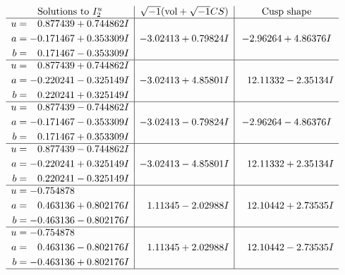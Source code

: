 \documentclass[1p]{elsarticle_modified}
\theoremstyle{definition}
\newcommand{\I}{\sqrt{-1}}
\begin{document}
$$\begin{array}{c|c|c}  
\text{Solutions to }I^u_{2}& \I (\text{vol} + \sqrt{-1}CS) & \text{Cusp shape}\\
 \hline 
\begin{aligned}
u &= \phantom{-}0.877439 + 0.744862 I \\
a &= -0.171467 + 0.353309 I \\
b &= \phantom{-}0.171467 - 0.353309 I\end{aligned}
 & -3.02413 + 0.79824 I & -2.96264 + 4.86376 I \\ \hline\begin{aligned}
u &= \phantom{-}0.877439 + 0.744862 I \\
a &= -0.220241 - 0.325149 I \\
b &= \phantom{-}0.220241 + 0.325149 I\end{aligned}
 & -3.02413 + 4.85801 I & \phantom{-}12.11332 - 2.35134 I \\ \hline\begin{aligned}
u &= \phantom{-}0.877439 - 0.744862 I \\
a &= -0.171467 - 0.353309 I \\
b &= \phantom{-}0.171467 + 0.353309 I\end{aligned}
 & -3.02413 - 0.79824 I & -2.96264 - 4.86376 I \\ \hline\begin{aligned}
u &= \phantom{-}0.877439 - 0.744862 I \\
a &= -0.220241 + 0.325149 I \\
b &= \phantom{-}0.220241 - 0.325149 I\end{aligned}
 & -3.02413 - 4.85801 I & \phantom{-}12.11332 + 2.35134 I \\ \hline\begin{aligned}
u &= -0.754878\phantom{ +0.000000I} \\
a &= \phantom{-}0.463136 + 0.802176 I \\
b &= -0.463136 - 0.802176 I\end{aligned}
 & \phantom{-}1.11345 - 2.02988 I & \phantom{-}12.10442 + 2.73535 I \\ \hline\begin{aligned}
u &= -0.754878\phantom{ +0.000000I} \\
a &= \phantom{-}0.463136 - 0.802176 I \\
b &= -0.463136 + 0.802176 I\end{aligned}
 & \phantom{-}1.11345 + 2.02988 I & \phantom{-}12.10442 - 2.73535 I\\
 \hline 
 \end{array}$$\newpage
\end{document}
